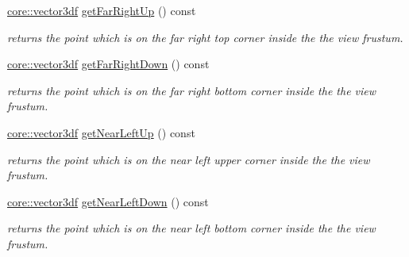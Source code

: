 \begin{DoxyCompactItemize}
\hyperlink{namespaceirr_1_1core_ae6e2b2a6c552833ebbd5b7463d03586b}{core\+::vector3df} \hyperlink{structirr_1_1scene_1_1SViewFrustum_a2cce344ced4939aebfe3c9d9396cb4ec}{get\+Far\+Right\+Up} () const
\begin{DoxyCompactList}\small\item\em returns the point which is on the far right top corner inside the the view frustum. \end{DoxyCompactList}\item 
\mbox{\label{structirr_1_1scene_1_1SViewFrustum_ab1bf1b3cf323812ed4259268ce7ecf76}} 
\hyperlink{namespaceirr_1_1core_ae6e2b2a6c552833ebbd5b7463d03586b}{core\+::vector3df} \hyperlink{structirr_1_1scene_1_1SViewFrustum_ab1bf1b3cf323812ed4259268ce7ecf76}{get\+Far\+Right\+Down} () const
\begin{DoxyCompactList}\small\item\em returns the point which is on the far right bottom corner inside the the view frustum. \end{DoxyCompactList}\item 
\mbox{\label{structirr_1_1scene_1_1SViewFrustum_ae2fae0821834125e0d34bb2fab27c643}} 
\hyperlink{namespaceirr_1_1core_ae6e2b2a6c552833ebbd5b7463d03586b}{core\+::vector3df} \hyperlink{structirr_1_1scene_1_1SViewFrustum_ae2fae0821834125e0d34bb2fab27c643}{get\+Near\+Left\+Up} () const
\begin{DoxyCompactList}\small\item\em returns the point which is on the near left upper corner inside the the view frustum. \end{DoxyCompactList}\item 
\mbox{\label{structirr_1_1scene_1_1SViewFrustum_ae73eb80d9fe631b8795bb9f9afdf5eff}} 
\hyperlink{namespaceirr_1_1core_ae6e2b2a6c552833ebbd5b7463d03586b}{core\+::vector3df} \hyperlink{structirr_1_1scene_1_1SViewFrustum_ae73eb80d9fe631b8795bb9f9afdf5eff}{get\+Near\+Left\+Down} () const
\begin{DoxyCompactList}\small\item\em returns the point which is on the near left bottom corner inside the the view frustum. \end{DoxyCompactList}\item 
\mbox{\label{structirr_1_1scene_1_1SViewFrustum_a498ea58e0ce6c52e655aa9d7fe387b84}} 

\end{DoxyCompactItemize}
